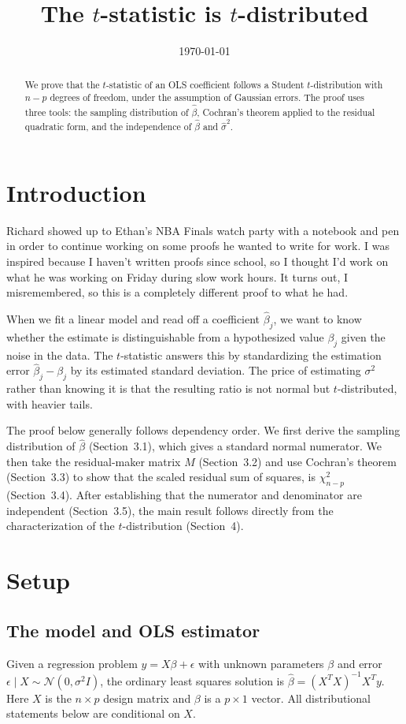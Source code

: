\documentclass[11pt]{article}
\title{The $t$-statistic is $t$-distributed}
\author{}
\date{\today}
\theoremstyle{definition}
\begin{document}
\maketitle
\begin{abstract}
We prove that the $t$-statistic of an OLS coefficient follows a Student
$t$-distribution with $n-p$ degrees of freedom, under the assumption of
Gaussian errors. The proof uses three tools: the sampling distribution
of $\widehat{\beta}$, Cochran's theorem applied to the residual quadratic form,
and the independence of $\widehat{\beta}$ and $\widehat{\sigma}^2$.
\end{abstract}

\section{Introduction}
Richard showed up to Ethan's NBA Finals watch party with a notebook 
and pen in order to continue working on some proofs he wanted to write 
for work. I was inspired because I haven't written proofs since school, so
I thought I'd work on what he was working on Friday during slow work hours. 
It turns out, I misremembered, so this is a completely different proof to 
what he had.

When we fit a linear model and read off a coefficient $\widehat{\beta}_j$, we want
to know whether the estimate is distinguishable from a hypothesized value
$\beta_j$ given the noise in the data. The $t$-statistic answers this by
standardizing the estimation error $\widehat{\beta}_j - \beta_j$ by its estimated
standard deviation. The price of estimating $\sigma^2$ rather than knowing it
is that the resulting ratio is not normal but $t$-distributed, with heavier
tails.

The proof below generally follows dependency order. We first derive the sampling
distribution of $\widehat{\beta}$ (Section~3.1), which gives a standard normal
numerator. We then take the residual-maker matrix $M$ (Section~3.2) and use
Cochran's theorem (Section~3.3) to show that the scaled residual sum of squares,
is $\chi^2_{n-p}$ (Section~3.4). After establishing that the
numerator and denominator are independent (Section~3.5), the main result
follows directly from the characterization of the $t$-distribution
(Section~4).

\section{Setup}

\subsection{The model and OLS estimator}
Given a regression problem $y = X\beta + \epsilon$ with unknown parameters $\beta$ and 
error $\epsilon \mid X \sim \mathcal{N}(0, \sigma^2 I)$, the 
ordinary least squares solution is $\widehat{\beta} = (X^T X)^{-1} X^T y$.
Here $X$ is the $n \times p$ design matrix and $\beta$ is a $p \times 1$
vector. All distributional statements below are conditional on $X$.
\end{document}
